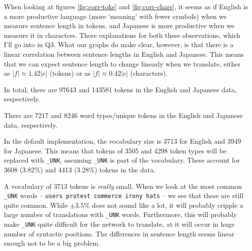 \documentclass[answers]{exam}
\begin{document}
\begin{CJK}{UTF8}{min}
\begin{questions}
\begin{framed}
\begin{compactenum}[1.]
  \item
    When looking at figures \ref{fig:corr-toks} and \ref{fig:corr-chars}, it
    seems as if English is a more productive language (more `meaning' with fewer
    symbols) when we measure sentence length in tokens, and Japanese is more
    productive when we measure it in characters. There explanations for both
    these observations, which I'll go into in Q3.
    What our graphs do make clear, however, is that there is a linear
    correlation between sentence lengths in English and Japanese. This means
    that we can expect sentence length to change linearly when we translate,
    either as $|f| \approx 1.42|e|$ (tokens) or as $|f| \approx 0.42|e|$
    (characters).
  \item
    In total, there are 97643 and 143581 tokens in the English and Japanese
    data, respectively.
  \item
    There are 7217 and 8246 word types/unique tokens in the English and Japanese
    data, respectively.
  \item
    In the default implementation, the vocabulary size is 3713 for English and
    3949 for Japanese. This means that tokens of 3505 and 4298 token types will
    be replaced with \texttt{\_UNK}, assuming \texttt{\_UNK} is part of the
    vocabulary. These account for 3608 (3.82\%) and 4413 (3.28\%) tokens in the
    data.
  \item
    A vocabulary of 3713 tokens is \emph{really} small. When we look at the most
    common \texttt{\_UNK} words -- \texttt{users protest commerce irony hats} --
    we see that these are still quite common. While $\pm 3.5\%$ does not sound
    like a lot, it will probably cripple a large number of translations with
    \texttt{\_UNK} words. Furthermore, this will probably make \texttt{\_UNK}
    quite difficult for the network to translate, at it will occur in huge
    number of syntactic positions.
    The differences in sentence length seems linear enough not to be a big
    problem.
  \end{compactenum}
\end{framed}



\end{questions}
\end{CJK}
\end{document}
